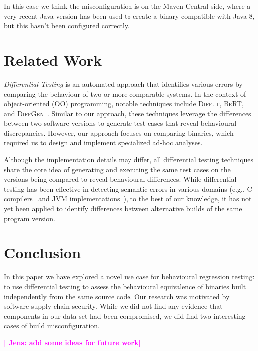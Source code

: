 \documentclass[conference]{IEEEtran}
\newcommand{\jens}[1]{\textbf{\textcolor{magenta}{[ \ding{46}Jens: #1]}}}
\begin{document}
In this case we think the misconfiguration is on the Maven Central side, where a very recent Java version has been used to create a binary compatible with Java 8, but this hasn't been configured correctly.








\section{Related Work}
\label{sec:relatedwork}

\emph{Differential Testing}\cite{difftesting} is an automated approach that identifies various errors by comparing the behaviour of two or more comparable systems\cite{xie2007towards,jin10:automated,diffgen}. In the context of object-oriented (OO) programming, notable techniques include \textsc{Diffut}\cite{xie2007towards}, \textsc{BeRT}\cite{jin10:automated}, and \textsc{DiffGen}~\cite{diffgen}. Similar to our approach, these techniques leverage the differences between two software versions to generate test cases that reveal behavioural discrepancies. However, our approach focuses on comparing binaries, which required us to design and implement specialized ad-hoc analyses.

Although the implementation details may differ, all differential testing techniques share the core idea of generating and executing the same test cases on the versions being compared to reveal behavioural differences. %
While differential testing has been effective in detecting semantic errors in various domains (e.g., C compilers~\cite{Yang:compiler:pldi:2011} and JVM implementations~\cite{Chen:jvmdiff:pldi:2016}), to the best of our knowledge, it has not yet been applied to identify differences between alternative builds of the same program version.


\section{Conclusion}
\label{sec:conclusion}

In this paper we have explored a novel use case for behavioural regression testing: to use differential testing to assess the behavioural equivalence of binaries built independently from the same source code. Our research was motivated by software supply chain security. While we did not find any evidence that components in our data set had been compromised, we did find two interesting cases of build misconfiguration.  

\jens{add some ideas for future work}




\end{document}
